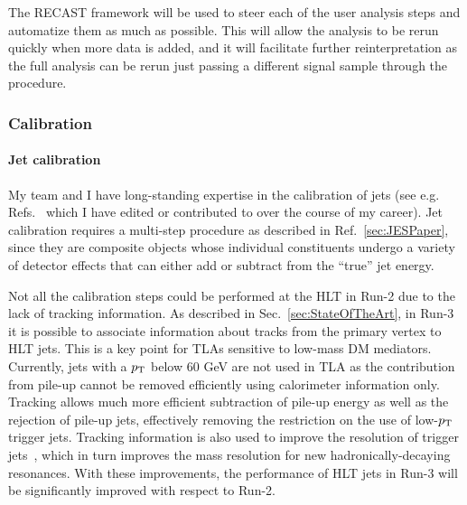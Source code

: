 The RECAST framework will be used to steer each of the user analysis steps and automatize them as much as possible. This will allow the analysis to be rerun quickly when more data is added, and it will facilitate further reinterpretation as the full analysis can be rerun just passing a different signal sample through the procedure. 


\subsubsection{Calibration}


\paragraph{Jet calibration} My team and I have long-standing expertise in the calibration of jets (see e.g. Refs.~\cite{JESPapersIAmAuthorOf} which I have edited or contributed to over the course of my career). 
Jet calibration requires a multi-step procedure as described in Ref.~\ref{sec:JESPaper}, since they are composite objects whose individual constituents undergo a variety of detector effects that can either add or subtract from the “true” jet energy. 

Not all the calibration steps could be performed at the HLT in Run-2 due to the lack of tracking information. As described in Sec.~\ref{sec:StateOfTheArt}, in Run-3 it is possible to associate information about tracks from the primary vertex to HLT jets.  This is a key point for TLAs sensitive to low-mass DM mediators. Currently, jets with a $p_{\rm{T}}$ below 60 GeV are not used in TLA as the contribution from pile-up cannot be removed efficiently using calorimeter information only. Tracking allows much more efficient subtraction of pile-up energy as well as the rejection of pile-up jets, effectively removing the restriction on the use of low-$p_{\rm{T}}$ trigger jets. Tracking information is also used to improve the resolution of trigger jets~\cite{GSC}, which in turn improves the mass resolution for new hadronically-decaying resonances. 
With these improvements, the performance of HLT jets in Run-3 will be significantly improved with respect to Run-2. 

 
